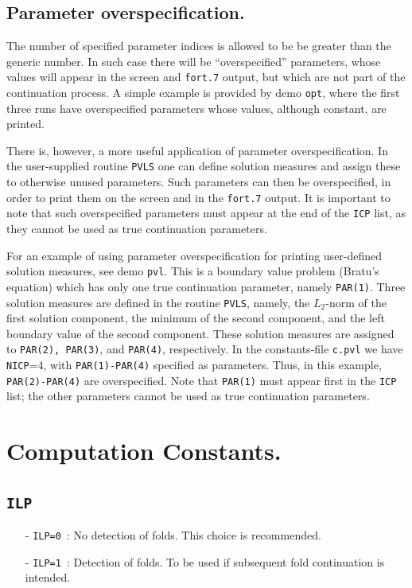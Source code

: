 \documentclass[12pt]{report}
\begin{document}
\subsection{ Parameter overspecification.} \label{sec:Parameter_over_specification}
The number of specified parameter indices is allowed to be be greater 
than the generic number.
In such case there will be ``overspecified'' parameters, whose values
will appear in the screen and {\tt fort.7} output, but which are not
part of the continuation process.
A simple example is provided by demo {\tt opt}, where the first three runs
have overspecified parameters whose values, although constant, are printed.

There is, however, a more useful application of parameter overspecification.
In the user-supplied routine {\tt PVLS} one can define solution measures
and assign these to otherwise unused parameters.
Such parameters can then be overspecified, in order to print them
on the screen and in the {\tt fort.7} output.
It is important to note that such overspecified parameters must appear
at the end of the {\tt ICP} list, as they cannot be used as true continuation
parameters.

For an example of using parameter overspecification for printing user-defined
solution measures, see demo {\tt pvl}.
This is a boundary value problem (Bratu's equation) which has
only one true continuation parameter, namely {\tt PAR(1)}.
Three solution measures are defined in the routine {\tt PVLS}, namely,
the $L_2$-norm of the first solution component,
the minimum of the second component, and
the left boundary value of the second component.
These solution measures are assigned to {\tt PAR(2), PAR(3)}, and {\tt PAR(4)}, respectively.
In the constants-file {\tt c.pvl} we have {\tt NICP}=4, with {\tt PAR(1)-PAR(4)}
specified as parameters.
Thus, in this example, {\tt PAR(2)-PAR(4)} are overspecified.
Note that {\tt PAR(1)} must appear first in the {\tt ICP} list;
the other parameters cannot be used as true continuation parameters.
\section{ Computation Constants.} \label{sec:Computation_constants}
\subsection{\tt ILP}  \label{sec:ILP}
\begin{itemize}
\item[-] {\tt ILP=0}~: 
  No detection of folds. This choice is recommended.
\item[-] {\tt ILP=1}~: 
  Detection of folds. To be used if subsequent fold continuation is intended.
\end{itemize}
 
\end{document}
